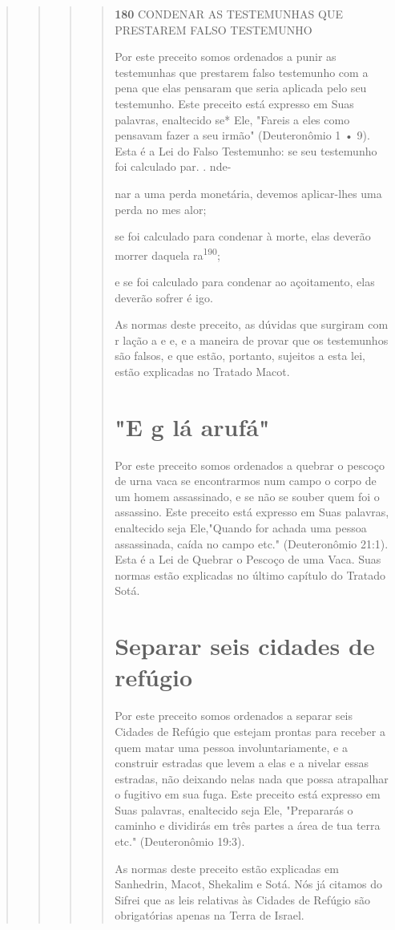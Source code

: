 \begin{quote}
\begin{quote}
\begin{quote}
\begin{quote}
\textbf{180} CONDENAR AS TESTEMUNHAS QUE PRESTAREM FALSO TESTEMUNHO

Por este preceito somos ordenados a punir as testemunhas que pres­tarem
falso testemunho com a pena que elas pensaram que seria aplicada pelo
seu testemunho. Este preceito está expresso em Suas palavras, enaltecido
se* Ele, "Fareis a eles como pensavam fazer a seu irmão" (Deuteronômio 1
• 9). Esta é a Lei do Falso Testemunho: se seu testemunho foi calculado
par. . nde-

nar a uma perda monetária, devemos aplicar-lhes uma perda no mes alor;

se foi calculado para condenar à morte, elas deverão morrer daquela
ra\textsuperscript{190};

e se foi calculado para condenar ao açoitamento, elas deverão sofrer é
igo.

As normas deste preceito, as dúvidas que surgiram com r lação a e e, e a
maneira de provar que os testemunhos são falsos, e que estão, portanto,
sujeitos a esta lei, estão explicadas no Tratado Macot.

\section{"E g lá arufá"}

Por este preceito somos ordenados a quebrar o pescoço de urna vaca se
encontrarmos num campo o corpo de um homem assassinado, e se não se
souber quem foi o assassino. Este preceito está expresso em Suas
pala­vras, enaltecido seja Ele,"Quando for achada uma pessoa
assassinada, caída no campo etc." (Deuteronômio 21:1). Esta é a Lei de
Quebrar o Pescoço de uma Vaca. Suas normas estão explicadas no último
capítulo do Tratado Sotá.

\section{Separar seis cidades de refúgio}

Por este preceito somos ordenados a separar seis Cidades de Refú­gio que
estejam prontas para receber a quem matar uma pessoa involuntaria­mente,
e a construir estradas que levem a elas e a nivelar essas estradas, não
deixando nelas nada que possa atrapalhar o fugitivo em sua fuga. Este
preceito está expresso em Suas palavras, enaltecido seja Ele,
"Prepararás o caminho e dividirás em três partes a área de tua terra
etc." (Deuteronômio 19:3).

As normas deste preceito estão explicadas em Sanhedrin, Macot, She­kalim
e Sotá. Nós já citamos do Sifrei que as leis relativas às Cidades de
Refúgio são obrigatórias apenas na Terra de Israel.


\end{quote}
\end{quote}
\end{quote}
\end{quote}
